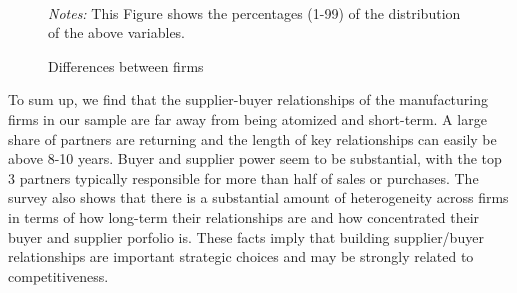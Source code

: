 \documentclass[final, dvipsnames, authoryear,12pt]{elsarticle}
\begin{document}
\begin{figure}[!h]
    \caption{Differences between firms}
    \label{fig:happy_few}
    \begin{center}
    \\
    \end{center}    
        {\footnotesize \textit{Notes:} This Figure shows the percentages (1-99) of the distribution of the above variables.} 
\end{figure}


To sum up, we find that the supplier-buyer relationships of the manufacturing firms in our sample are far away from being atomized and short-term. A large share of partners are returning and the length of key relationships can easily be above 8-10 years. Buyer and supplier power seem to be substantial, with the top 3 partners typically responsible for more than half of sales or purchases. The survey also shows that there is a substantial amount of heterogeneity across firms in terms of how long-term their relationships are and how concentrated their buyer and supplier porfolio is. These facts imply that building supplier/buyer relationships are important strategic choices and may be strongly related to competitiveness.
\end{document}
